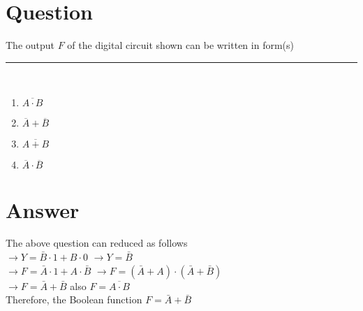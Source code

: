 \documentclass[journal,12pt,twocolumn]{IEEEtran}
\title{\mytitle}
\author{\myauthor\hspace{1em}\\\contact\\IITH\hspace{0.5em}-\hspace{0.6em}\mymodule}
\date{20-12-2022}
\title{\mytitle}
\author{\myauthor\hspace{1em}\\\contact\\IITH\hspace{0.5em}-\hspace{0.6em}\mymodule}
\date{20-12-2022}
\begin{document}
%



\theoremstyle{definition}
\newtheorem{theorem}{Theorem}[section]
\newtheorem{problem}{Problem}
\newtheorem{proposition}{Proposition}[section]
\newtheorem{lemma}{Lemma}[section]
\newtheorem{corollary}[theorem]{Corollary}
\newtheorem{example}{Example}[section]
\newtheorem{definition}{Definition}[section]
\newcommand{\BEQA}{\begin{eqnarray}}
\newcommand{\EEQA}{\end{eqnarray}}
\newcommand{\define}{\stackrel{\triangle}{=}}


\vspace{3cm}
\maketitle
\tableofcontents
\section{\textbf{Question}}
The output $F$ of the digital circuit shown can be written in form(s) \rule{12mm}{0.6pt}
\vspace{\baselineskip}\\
\begin{enumerate}[label=(\alph*)]
    \item $\overline{A \cdot B} $
    \item $\overline A + \overline B$
    \item $ \overline{A+B}$
    \item $\overline A \cdot \overline B$
\end{enumerate}
    \section{\textbf{Answer}}
    The above question can reduced as follows \\
    $\rightarrow Y=\bar B\cdot 1 + B \cdot 0$
    $\rightarrow Y=\bar B$\\
    $\rightarrow F = \bar A \cdot 1 + A \cdot \bar B$
    $\rightarrow F = (\bar A + A)\cdot(\bar A+ \bar B)$\\
    $\rightarrow F = \bar A + \bar B$ also $F=\overline{A\cdot B}$\\
    Therefore, the Boolean function $F = \bar A + \bar B$
\end{document}
